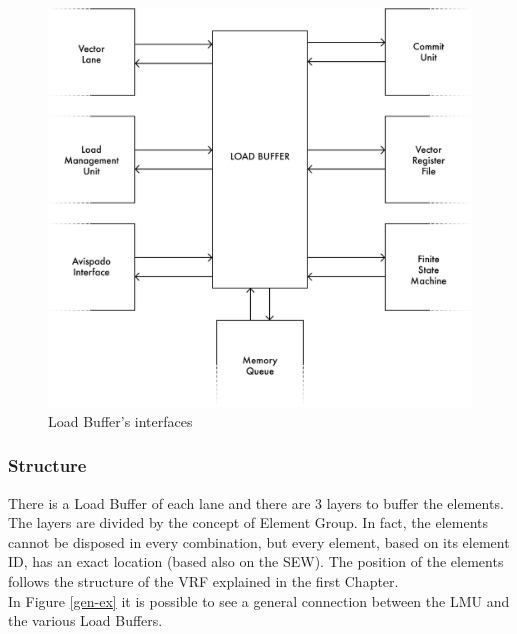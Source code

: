 \begin{figure}[H]
    \centering
    \includegraphics[scale = 0.4]{Chapter_2/img/lb-if.png}
    \caption{Load Buffer's interfaces}
    \label{lb-if}
\end{figure}

\subsubsection{Structure}
There is a Load Buffer of each lane and there are 3 layers to buffer the elements. The layers are divided by the concept of Element Group. In fact, the elements cannot be disposed in every combination, but every element, based on its element ID, has an exact location (based also on the SEW). The position  of the elements follows the structure of the VRF explained in the first Chapter.\\

In Figure \ref{gen-ex} it is possible to see a general connection between the LMU and the various Load Buffers.\\

